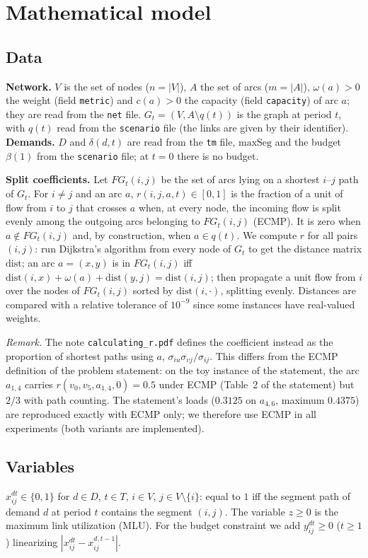 \section{Mathematical model}
\subsection{Data}
\textbf{Network.} $V$ is the set of nodes ($n=|V|$), $A$ the set of arcs ($m=|A|$), $\omega(a)>0$ the weight (field \texttt{metric}) and $c(a)>0$ the capacity (field \texttt{capacity}) of arc $a$; they are read from the \texttt{net} file. $G_t=(V,A\setminus q(t))$ is the graph at period $t$, with $q(t)$ read from the \texttt{scenario} file (the links are given by their identifier). \textbf{Demands.} $D$ and $\delta(d,t)$ are read from the \texttt{tm} file, $\mathrm{maxSeg}$ and the budget $\beta(1)$ from the \texttt{scenario} file; at $t=0$ there is no budget.

\textbf{Split coefficients.} Let $FG_t(i,j)$ be the set of arcs lying on a shortest $i$--$j$ path of $G_t$. For $i\neq j$ and an arc $a$, $r(i,j,a,t)\in[0,1]$ is the fraction of a unit of flow from $i$ to $j$ that crosses $a$ when, at every node, the incoming flow is split evenly among the outgoing arcs belonging to $FG_t(i,j)$ (ECMP). It is zero when $a\notin FG_t(i,j)$ and, by construction, when $a\in q(t)$. We compute $r$ for all pairs $(i,j)$: run Dijkstra's algorithm from every node of $G_t$ to get the distance matrix $\mathrm{dist}$; an arc $a=(x,y)$ is in $FG_t(i,j)$ iff $\mathrm{dist}(i,x)+\omega(a)+\mathrm{dist}(y,j)=\mathrm{dist}(i,j)$; then propagate a unit flow from $i$ over the nodes of $FG_t(i,j)$ sorted by $\mathrm{dist}(i,\cdot)$, splitting evenly. Distances are compared with a relative tolerance of $10^{-9}$ since some instances have real-valued weights.

\emph{Remark.} The note \texttt{calculating\_r.pdf} defines the coefficient instead as the proportion of shortest paths using $a$, $\sigma_{iu}\sigma_{vj}/\sigma_{ij}$. This differs from the ECMP definition of the problem statement: on the toy instance of the statement, the arc $a_{1,4}$ carries $r(v_0,v_5,a_{1,4},0)=0.5$ under ECMP (Table~2 of the statement) but $2/3$ with path counting. The statement's loads ($0.3125$ on $a_{4,6}$, maximum $0.4375$) are reproduced exactly with ECMP only; we therefore use ECMP in all experiments (both variants are implemented).

\subsection{Variables}
$x^{dt}_{ij}\in\{0,1\}$ for $d\in D$, $t\in T$, $i\in V$, $j\in V\setminus\{i\}$: equal to $1$ iff the segment path of demand $d$ at period $t$ contains the segment $(i,j)$. The variable $z\ge 0$ is the maximum link utilization (MLU). For the budget constraint we add $y^{dt}_{ij}\ge 0$ ($t\ge 1$) linearizing $|x^{dt}_{ij}-x^{d,t-1}_{ij}|$.

